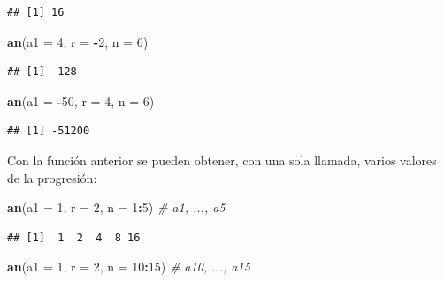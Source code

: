 \documentclass[]{book}
\newenvironment{Shaded}{\begin{snugshade}}{\end{snugshade}}
\newcommand{\KeywordTok}[1]{\textcolor[rgb]{0.13,0.29,0.53}{\textbf{#1}}}
\newcommand{\DataTypeTok}[1]{\textcolor[rgb]{0.13,0.29,0.53}{#1}}
\newcommand{\DecValTok}[1]{\textcolor[rgb]{0.00,0.00,0.81}{#1}}
\newcommand{\CommentTok}[1]{\textcolor[rgb]{0.56,0.35,0.01}{\textit{#1}}}
\newcommand{\OperatorTok}[1]{\textcolor[rgb]{0.81,0.36,0.00}{\textbf{#1}}}
\newcommand{\NormalTok}[1]{#1}
\begin{document}
\begin{verbatim}
## [1] 16
\end{verbatim}

\begin{Shaded}
\begin{Highlighting}[]
\KeywordTok{an}\NormalTok{(}\DataTypeTok{a1 =} \DecValTok{4}\NormalTok{, }\DataTypeTok{r =} \OperatorTok{-}\DecValTok{2}\NormalTok{, }\DataTypeTok{n =} \DecValTok{6}\NormalTok{)}
\end{Highlighting}
\end{Shaded}

\begin{verbatim}
## [1] -128
\end{verbatim}

\begin{Shaded}
\begin{Highlighting}[]
\KeywordTok{an}\NormalTok{(}\DataTypeTok{a1 =} \OperatorTok{-}\DecValTok{50}\NormalTok{, }\DataTypeTok{r =} \DecValTok{4}\NormalTok{, }\DataTypeTok{n =} \DecValTok{6}\NormalTok{)}
\end{Highlighting}
\end{Shaded}

\begin{verbatim}
## [1] -51200
\end{verbatim}

Con la función anterior se pueden obtener, con una sola llamada, varios
valores de la progresión:

\begin{Shaded}
\begin{Highlighting}[]
\KeywordTok{an}\NormalTok{(}\DataTypeTok{a1 =} \DecValTok{1}\NormalTok{, }\DataTypeTok{r =} \DecValTok{2}\NormalTok{, }\DataTypeTok{n =} \DecValTok{1}\OperatorTok{:}\DecValTok{5}\NormalTok{)    }\CommentTok{# a1, ..., a5}
\end{Highlighting}
\end{Shaded}

\begin{verbatim}
## [1]  1  2  4  8 16
\end{verbatim}

\begin{Shaded}
\begin{Highlighting}[]
\KeywordTok{an}\NormalTok{(}\DataTypeTok{a1 =} \DecValTok{1}\NormalTok{, }\DataTypeTok{r =} \DecValTok{2}\NormalTok{, }\DataTypeTok{n =} \DecValTok{10}\OperatorTok{:}\DecValTok{15}\NormalTok{)  }\CommentTok{# a10, ..., a15}
\end{Highlighting}
\end{Shaded}
\end{document}
